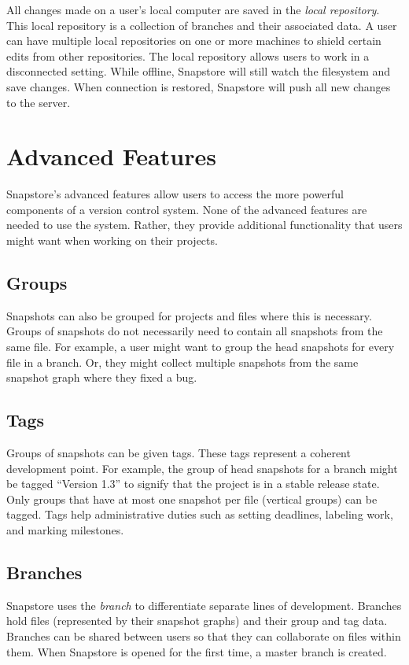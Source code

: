 All changes made on a user's local computer are saved in the \textit{local repository}. This local repository is a collection of branches and their associated data. A user can have multiple local repositories on one or more machines to shield certain edits from other repositories. The local repository allows users to work in a disconnected setting. While offline, Snapstore will still watch the filesystem and save changes. When connection is restored, Snapstore will push all new changes to the server.

\section{Advanced Features}

Snapstore's advanced features allow users to access the more powerful components of a version control system. None of the advanced features are needed to use the system. Rather, they provide additional functionality that users might want when working on their projects.

\subsection{Groups}

Snapshots can also be grouped for projects and files where this is necessary. Groups of snapshots do not necessarily need to contain all snapshots from the same file. For example, a user might want to group the head snapshots for every file in a branch. Or, they might collect multiple snapshots from the same snapshot graph where they fixed a bug.

\subsection{Tags}

Groups of snapshots can be given tags. These tags represent a coherent development point. For example, the group of head snapshots for a branch might be tagged ``Version 1.3'' to signify that the project is in a stable release state. Only groups that have at most one snapshot per file (vertical groups) can be tagged. Tags help administrative duties such as setting deadlines, labeling work, and marking milestones.

\subsection{Branches}

Snapstore uses the \textit{branch} to differentiate separate lines of development. Branches hold files (represented by their snapshot graphs) and their group and tag data. Branches can be shared between users so that they can collaborate on files within them. When Snapstore is opened for the first time, a master branch is created.

